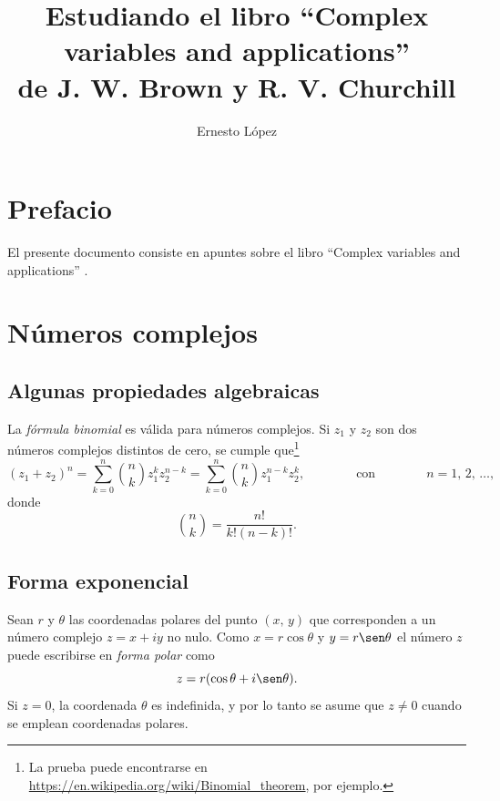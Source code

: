 \documentclass[a4paper]{report}
\title{Estudiando el libro ``Complex variables and applications''\\de J. W. Brown y R. V. Churchill}
\author{Ernesto López}
\begin{document}
 

\hypersetup{pageanchor=false}
\maketitle
\hypersetup{pageanchor=true}
\tableofcontents


\chapter*{Prefacio}

El presente documento consiste en apuntes sobre el libro ``Complex variables and applications'' \cite{brown2013complex}.


\chapter{Números complejos}

\section{Algunas propiedades algebraicas}

La \emph{fórmula binomial} es válida para números complejos. Si \(z_1\) y \(z_2\) son dos números complejos distintos de cero, se cumple que\footnote{La prueba puede encontrarse en \url{https://en.wikipedia.org/wiki/Binomial_theorem}, por ejemplo.} 
\begin{equation}\label{eq:binomial_theorem}
 (z_1+z_2)^n=\sum_{k=0}^n\binom{n}{k}z_1^{k}z_2^{n-k}=\sum_{k=0}^n\binom{n}{k}z_1^{n-k}z_2^k,
 \qquad\qquad\textrm{con}\qquad\qquad
 n=1,\,2,\,\dots,
\end{equation}
donde
\[
 \binom{n}{k}=\frac{n!}{k!(n-k)!}.
\]

\section{Forma exponencial}\label{sec:exponential_form}

Sean \(r\) y \(\theta\) las coordenadas polares del punto \((x,\,y)\) que corresponden a un número complejo \(z=x+iy\) no nulo. Como \(x=r\cos\theta\) y \(y=r\sen\theta\) el número \(z\) puede escribirse en \emph{forma polar} como 
\[
 z=r(\cos\theta+i\sen\theta).
\]
Si \(z=0\), la coordenada \(\theta\) es indefinida, y por lo tanto se asume que \(z\neq0\) cuando se emplean coordenadas polares.
\end{document}
